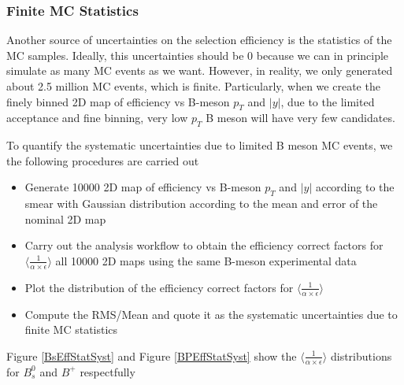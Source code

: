 \subsubsection{Finite MC Statistics}

Another source of uncertainties on the selection efficiency is the statistics of the MC samples. Ideally, this uncertainties should be 0 because we can in principle simulate as many MC events as we want. However, in reality, we only generated about 2.5 million MC events, which is finite. Particularly, when we create the finely binned 2D map of efficiency vs B-meson $p_T$ and $|y|$, due to the limited acceptance and fine binning, very low $p_T$ B meson will have very few candidates.

To quantify the systematic uncertainties due to limited B meson MC events, we the following procedures are carried out

\begin{itemize}
\item Generate 10000 2D map of efficiency vs B-meson $p_T$ and $|y|$ according to the smear with Gaussian distribution according to the mean and error of the nominal 2D map
\item Carry out the analysis workflow to obtain the efficiency correct factors for $\langle\frac{1}{\alpha \times \epsilon}\rangle$ all 10000 2D maps using the same B-meson experimental data 
\item Plot the distribution of the efficiency correct factors for $\langle\frac{1}{\alpha \times \epsilon}\rangle$
\item Compute the RMS/Mean and quote it as the systematic uncertainties due to finite MC statistics
\end{itemize}

Figure \ref{BsEffStatSyst} and Figure \ref{BPEffStatSyst} show the $\langle\frac{1}{\alpha \times \epsilon}\rangle$ distributions for $B^0_s$ and $B^+$ respectfully

